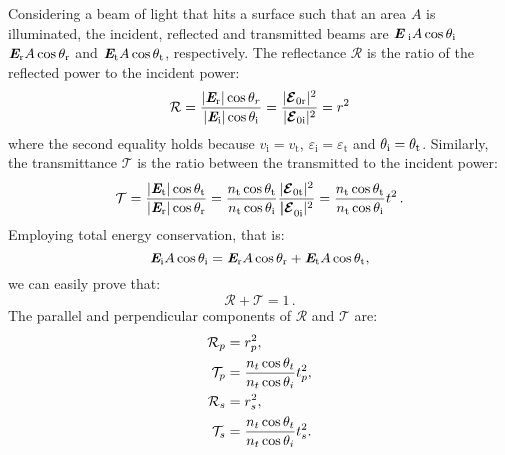Considering a beam of light that hits a surface such that an area $A$ is illuminated, the incident, reflected and transmitted beams are 
$\textit{\textbf{E}}_\textrm{
i} A\cos\theta_\textrm{i}$ $\textit{\textbf{E}}_\textrm{r} A\cos\theta_\textrm{r}$ and 
$\textit{\textbf{E}}_\textrm{t} A\cos\theta_\textrm{t}$, respectively. %
The reflectance $\mathcal{R}$ is the ratio of the reflected power to the incident power:
\begin{equation}\label{reflectance}
\mathcal{R} = \frac{|\textit{\textbf{E}}_\textrm{r}|\cos\theta_r}{|\textit{\textbf{E}}_\textrm{i}|\cos\theta_\textrm{i}} = \frac{|\boldsymbol{\mathcal{E}}_{0 \textrm{r}}|^2}{|\boldsymbol{\mathcal{E}}_{0 \textrm{i}}|^2} = r^2
\end{equation}
where the second equality holds because $v_{\textrm{i}}= v_{\textrm{t}}$, $\varepsilon_{\textrm{i}} = \varepsilon_{\textrm{t}}$ and $\theta_{\textrm{i}} = \theta_{\textrm{t}}$.
Similarly, the transmittance $\mathcal{T}$ is the ratio between the transmitted to the incident power:
\begin{equation}\label{transmittance}
\mathcal{T} = \frac{|\textit{\textbf{E}}_\textrm{t}| \cos\theta_\textrm{t}}{|\textit{\textbf{E}}_\textrm{r}|\cos\theta_\textrm{r}} = \frac{n_\textrm{t} \cos\theta_\textrm{t}}{n_\textrm{t} \cos\theta_\textrm{i}}\frac{|\boldsymbol{\mathcal{E}}_{0 \textrm{t}}|^2}{\boldsymbol{|\mathcal{E}}_{0 \textrm{i}}|^2} = \frac{n_\textrm{t} \cos\theta_\textrm{t}}{n_\textrm{t} \cos\theta_\textrm{i}} t^2\,.
\end{equation}
Employing total energy conservation, that is:
\begin{equation}
\textit{\textbf{E}}_\textrm{i} A\cos\theta_\textrm{i} = \textit{\textbf{E}}_\textrm{r} A\cos\theta_\textrm{r}+\textit{\textbf{E}}_\textrm{t} A\cos\theta_\textrm{t},
\end{equation}
we can easily prove that:
\begin{equation}
\mathcal{R}+\mathcal{T}=1\,.
\end{equation}
 The parallel and perpendicular components of $\mathcal{R}$ and $\mathcal{T}$ are:
\begin{equation}\label{Fresnel_pands}
\begin{split}
\mathcal{R}_p& =  {r_p^2},\\
\mathcal{T}_p &=  \frac{n_t \cos\theta_t}{n_t \cos\theta_i}t_p^2,\\
\mathcal{R}_s &=  r_s^2,\\
\mathcal{T}_s &= \frac{n_t \cos\theta_t}{n_t \cos\theta_i}t_s^2.\\
\end{split}
\end{equation}
